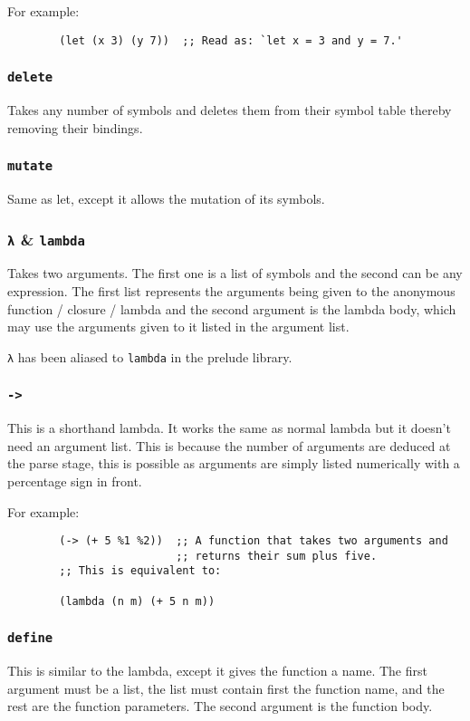 \documentclass{article}
\newcommand{\code}[1]{\texttt{#1}}
\begin{document}
      For example:
      \begin{verbatim}
        (let (x 3) (y 7))  ;; Read as: `let x = 3 and y = 7.'
      \end{verbatim}

    \subsubsection{\code{delete}}
      Takes any number of symbols and deletes them from their
      symbol table thereby removing their bindings.

    \subsubsection{\code{mutate}}
      Same as let, except it allows the mutation of its symbols.

    \subsubsection{\code{λ} \& \code{lambda}}
      Takes two arguments. The first one is a list of symbols
      and the second can be any expression. The first list represents
      the arguments being given to the anonymous function / closure / lambda
      and the second argument is the lambda body, which may use the arguments
      given to it listed in the argument list.

      \code{λ} has been aliased to \code{lambda} in the prelude
      library.

    \subsubsection{\code{->}}
      This is a shorthand lambda. It works the same as normal lambda but
      it doesn't need an argument list. This is because the number of
      arguments are deduced at the parse stage, this is possible as
      arguments are simply listed numerically with a percentage sign
      in front.

      For example:

      \begin{verbatim}
        (-> (+ 5 %1 %2))  ;; A function that takes two arguments and
                          ;; returns their sum plus five.
        ;; This is equivalent to:

        (lambda (n m) (+ 5 n m))
      \end{verbatim}

    \subsubsection{\code{define}}
    This is similar to the lambda, except it gives the function a name.
    The first argument must be a list, the list must contain first
    the function name, and the rest are the function parameters.
    The second argument is the function body.
\end{document}
